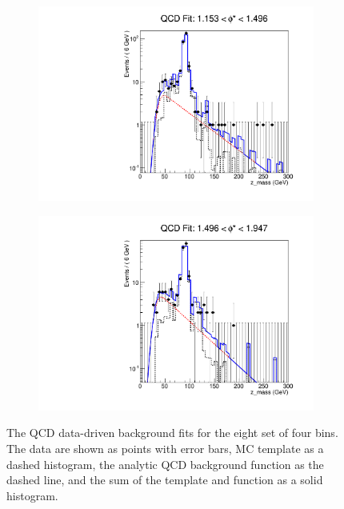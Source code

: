 \begin{figure}[!htbp]
\begin{subfigure}[b]{0.5\textwidth}
        \includegraphics[width=\linewidth]{figures/qcd_fits/qcd_fit_plot_for_31.pdf}
        \caption{}
        \label{fig:qcd_fit_31}
    \end{subfigure}%
    \begin{subfigure}[b]{0.5\textwidth}
        \includegraphics[width=\linewidth]{figures/qcd_fits/qcd_fit_plot_for_32.pdf}
        \caption{}
        \label{fig:qcd_fit_32}
    \end{subfigure}
    \caption{
       The QCD data-driven background fits for the eight set of four \phistar
       bins. The data are shown as points with error bars, MC template as a dashed histogram, the analytic QCD background function as the dashed
       line, and the sum of the template and function as a solid histogram.
    }
    \label{fig:qcd_many_8}
\end{figure}

